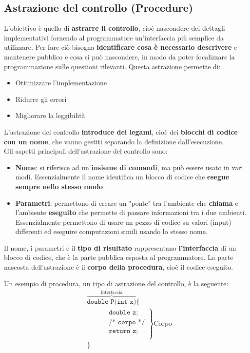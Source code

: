 \documentclass[a4paper]{article}
\begin{document}
\subsection{Astrazione del controllo (Procedure)}
L'obiettivo è quello di \textbf{astrarre il controllo}, cioè nascondere dei
dettagli implementativi fornendo al programmatore un'interfaccia più semplice da
utilizzare.
Per fare ciò bisogna \textbf{identificare cosa è necessario descrivere} e mantenere
pubblico e cosa si può nascondere, in modo da poter focalizzare la programmazione
sulle questioni rilevanti. Questa astrazione permette di:
\begin{itemize}
  \item Ottimizzare l'implementazione
  \item Ridurre gli errori
  \item Migliorare la leggibilità
\end{itemize}
L'astrazione del controllo \textbf{introduce dei legami}, cioè dei \textbf{blocchi di
codice con un nome}, che vanno gestiti separando la definizione dall'esecuzione. \\
Gli aspetti principali dell'astrazione del controllo sono:
\begin{itemize}
  \item \textbf{Nome}: si riferisce ad un \textbf{insieme di comandi}, ma può essere
    usato in vari modi. Essenzialmente il nome identifica un blocco di codice
    che \textbf{esegue sempre nello stesso modo}

  \item \textbf{Parametri}: permettono di creare un "ponte" tra l'ambiente che
    \textbf{chiama} e l'ambiente \textbf{eseguito} che permette di passare informazioni
    tra i due ambienti. Essenzialmente permettono di usare un pezzo di codice su
    valori (input) differenti ed eseguire computazioni simili usando lo stesso nome.
\end{itemize}
Il nome, i parametri e il \textbf{tipo di risultato} rappresentano
\textbf{l'interfaccia} di un blocco di codice, che è la parte pubblica esposta al
programmatore. La parte nascosta dell'astrazione è il \textbf{corpo della procedura},
cioè il codice eseguito.

\begin{Example}{}{}
  Un esempio di procedura, un tipo di astrazione del controllo, è la seguente:
  \[
    \begin{aligned}
      &\overbrace{\texttt{double P(int x)}}^{\text{Interfaccia}} \texttt{\{}\\
      &\quad\left.
      \begin{aligned}
        &\quad \texttt{double z;}\\
        &\quad \texttt{/* corpo */}\\
        &\quad \texttt{return z;}\\
      \end{aligned}
      \right\} \text{Corpo} \\
      &\texttt{\}}
    \end{aligned}
  \] 
\end{Example}
\end{document}
